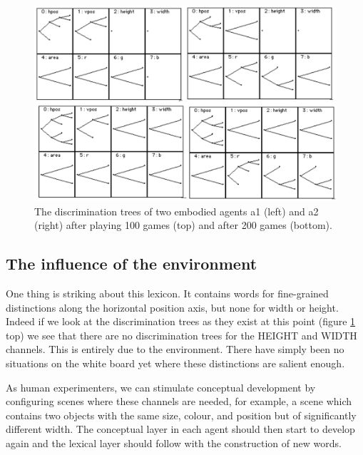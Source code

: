 \begin{figure}[htbp]
  \centerline{\includegraphics[width=.75\textwidth]{chap7/figs/discri200}}
\caption{ \label{discri200} The discrimination trees 
of two embodied agents {\bfshape a1} (left) and {\bfshape a2} (right) 
after playing 100 games (top) and after 200 games (bottom).}
\end{figure}

\subsection{The influence of the environment}

One thing is striking about this lexicon. It contains
words for fine-grained distinctions along the 
horizontal position axis, but none for width or 
height. Indeed if we look at the discrimination
trees as they exist at this point (figure 
\ref{discri200} top) we see that there are no 
discrimination trees for the HEIGHT and WIDTH
channels. This is entirely due to the 
environment. There have simply been no situations on 
the white board yet where these distinctions are salient 
enough. 

As human experimenters, we can stimulate conceptual 
development by configuring scenes where these
channels are needed, for example, a scene 
which contains two objects with the same size, colour, 
and position but of significantly different width. The 
conceptual layer in each agent
should then start to develop again
and the lexical layer should follow with the 
construction of new words. 


